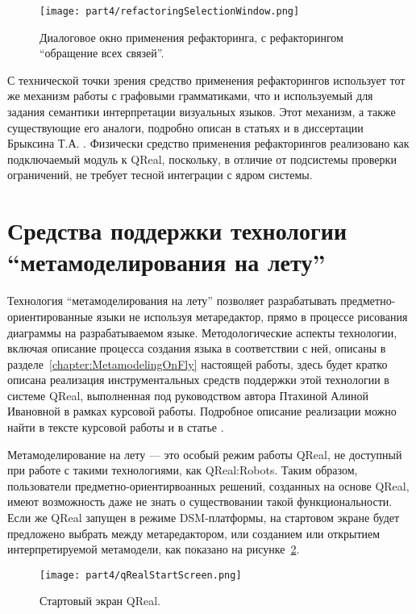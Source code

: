 \begin{figure} [ht]
	\begin{center}
		\texttt{[image: part4/refactoringSelectionWindow.png]}
		\caption{Диалоговое окно применения рефакторинга, с рефакторингом "`обращение всех связей"'.}
		\label{image:refactoringSelectionWindow}
	\end{center}
\end{figure}

С технической точки зрения средство применения рефакторингов использует тот же механизм 
работы с графовыми грамматиками, что и используемый для задания семантики интерпретации 
визуальных языков. Этот механизм, а также существующие его аналоги, подробно описан 
в статьях и в диссертации Брыксина Т.А.
. Физически средство применения рефакторингов реализовано как подключаемый модуль к 
QReal, поскольку, в отличие от подсистемы проверки ограничений, не требует тесной 
интеграции с ядром системы.

\section{Средства поддержки технологии "`метамоделирования на лету"'}
Технология "`метамоделирования на лету"' позволяет разрабатывать предметно-ориентированные 
языки не используя метаредактор, прямо в процессе рисования диаграммы на разрабатываемом 
языке. Методологические аспекты технологии, включая описание процесса создания языка 
в соответствии с ней, описаны в разделе~\ref{chapter:MetamodelingOnFly} настоящей 
работы, здесь будет кратко описана реализация инструментальных средств поддержки этой 
технологии в системе QReal, выполненная под руководством автора Птахиной Алиной Ивановной 
в рамках курсовой работы. Подробное описание реализации можно найти в тексте курсовой 
работы и в статье
.

Метамоделирование на лету --- это особый режим работы QReal, не доступный при работе 
с такими технологиями, как QReal:Robots. Таким образом, пользователи предметно-ориентирвоанных 
решений, созданных на основе QReal, имеют возможность даже не знать о существовании 
такой функциональности. Если же QReal запущен в режиме DSM-платформы, на стартовом 
экране будет предложено выбрать между метаредактором, или созданием или открытием 
интерпретируемой метамодели, как показано на рисунке~\ref{image:qRealStartScreen}.

\begin{figure} [ht]
	\begin{center}
		\texttt{[image: part4/qRealStartScreen.png]}
		\caption{Стартовый экран QReal.}
		\label{image:qRealStartScreen}
	\end{center}
\end{figure}

